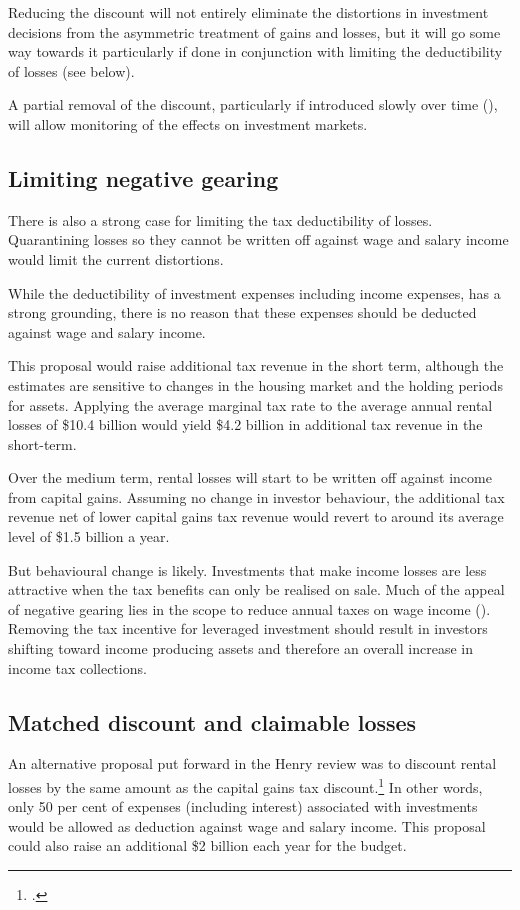\documentclass{grattan}\usepackage[]{graphicx}\usepackage[]{color}
\begin{document}
Reducing the discount will not entirely eliminate the distortions in investment decisions from the asymmetric treatment of gains and losses, but it will go some way towards it particularly if done in conjunction with limiting the deductibility of losses (see below). 

A partial removal of the discount, particularly if introduced slowly over time (), will allow monitoring of the effects on investment markets. 

\subsection{Limiting negative gearing}
There is also a strong case for limiting the tax deductibility of losses. Quarantining losses so they cannot be written off against wage and salary income would limit the current distortions. 

While the deductibility of investment expenses including income expenses, has a strong grounding, there is no reason that these expenses should be deducted against wage and salary income.

This proposal would raise additional tax revenue in the short term, although the estimates are sensitive to changes in the housing market and the holding periods for assets. Applying the average marginal tax rate to the average annual rental losses of \$10.4 billion would yield \$4.2 billion in additional tax revenue in the short-term. 

Over the medium term, rental losses will start to be written off against income from capital gains. Assuming no change in investor behaviour, the additional tax revenue net of lower capital gains tax revenue would revert to around its average level of \$1.5 billion a year. 

But behavioural change is likely. Investments that make income losses are less attractive when the tax benefits can only be realised on sale. Much of the appeal of negative gearing lies in the scope to reduce annual taxes on wage income (). Removing the tax incentive for leveraged investment should result in investors shifting toward income producing assets and therefore an overall increase in income tax collections.  

\subsection{Matched discount and claimable losses}
An alternative proposal put forward in the Henry review was to discount rental losses by the same amount as the capital gains tax discount.\footcite[pp.~70,72]{Treasury2010}  In other words, only 50 per cent of expenses (including interest) associated with investments would be allowed as deduction against wage and salary income.  This proposal could also raise an additional \$2 billion each year for the budget. 
\end{document}
